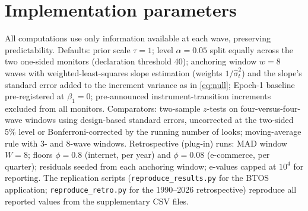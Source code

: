 \documentclass[review,authoryear,12pt]{elsarticle}
\begin{document}
\section{Implementation parameters}
\label{app:implementation}

All computations use only information available at each wave, preserving predictability. Defaults: prior scale $\tau = 1$; level $\alpha = 0.05$ split equally across the two one-sided monitors (declaration threshold 40); anchoring window $w = 8$ waves with weighted-least-squares slope estimation (weights $1/\hat{\sigma}_t^2$) and the slope's standard error added to the increment variance as in \eqref{eq:null}; Epoch-1 baseline pre-registered at $\beta_1 = 0$; pre-announced instrument-transition increments excluded from all monitors. Comparators: two-sample $z$-tests on four-versus-four-wave windows using design-based standard errors, uncorrected at the two-sided 5\% level or Bonferroni-corrected by the running number of looks; moving-average rule with 3- and 8-wave windows. Retrospective (plug-in) runs: MAD window $W = 8$; floors $\phi = 0.8$ (internet, per year) and $\phi = 0.08$ (e-commerce, per quarter); residuals seeded from each anchoring window; e-values capped at $10^4$ for reporting. The replication scripts (\texttt{reproduce\_results.py} for the BTOS application; \texttt{reproduce\_retro.py} for the 1990--2026 retrospective) reproduce all reported values from the supplementary CSV files.
\end{document}
